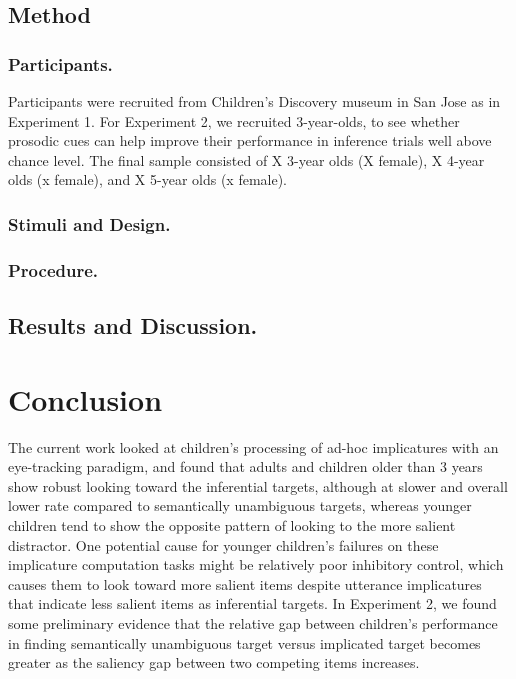 \documentclass[10pt,letterpaper]{article}
\begin{document}
\subsection{Method}

\subsubsection{Participants.}

Participants were recruited from Children's Discovery museum in San Jose as in Experiment 1. For Experiment 2, we recruited 3-year-olds, to see whether prosodic cues can help improve their performance in inference trials well above chance level. The final sample consisted of X 3-year olds (X female), X 4-year olds (x female), and X 5-year olds (x female).

\subsubsection{Stimuli and Design.}


\subsubsection{Procedure.}


\subsection{Results and Discussion.}


\section{Conclusion}

The current work looked at children's processing of ad-hoc implicatures with an eye-tracking paradigm, and found that adults and children older than 3 years show robust looking toward the inferential targets, although at slower and overall lower rate compared to semantically unambiguous targets, whereas younger children tend to show the opposite pattern of looking to the more salient distractor. One potential cause for younger children's failures on these implicature computation tasks might be relatively poor inhibitory control, which causes them to look toward more salient items despite utterance implicatures that indicate less salient items as inferential targets. In Experiment 2, we found some preliminary evidence that the relative gap between children's performance in finding semantically unambiguous target versus implicated target becomes greater as the saliency gap between two competing items increases. 
\end{document}
